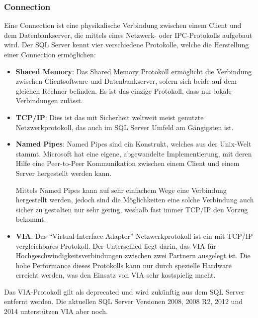         \subsubsection{Connection}
          Eine Connection ist eine physikalische Verbindung zwischen einem
          Client und dem Datenbankserver, die mittels eines Netzwerk- oder
          IPC-Protokolls aufgebaut wird. Der SQL Server kennt vier verschiedene
          Protokolle, welche die Herstellung einer Connection ermöglichen:
          \begin{itemize}
              \item \textbf{Shared Memory}: Das Shared Memory Protokoll
              ermöglicht die Verbindung zwischen Clientsoftware und
              Datenbankserver, sofern sich beide auf dem gleichen Rechner
              befinden. Es ist das einzige Protokoll, dass nur lokale
              Verbindungen zulässt.
              \item \textbf{TCP/IP}: Dies ist das mit Sicherheit weltweit meist
              genutzte Netzwerkprotokoll, das auch im SQL Server Umfeld am
              Gängigsten ist.
              \item \textbf{Named Pipes}: Named Pipes sind ein Konstrukt,
              welches aus der Unix-Welt stammt. Microsoft hat eine eigene,
              abgewandelte Implementierung, mit deren Hilfe eine Peer-to-Peer
              Kommunikation zwischen einem Client und einem Server hergestellt
              werden kann. 
              
              Mittels Named Pipes kann auf sehr einfachem Wege eine
              Verbindung hergestellt werden, jedoch sind die Möglichkeiten eine
              solche Verbindung auch sicher zu gestalten nur sehr gering,
              weshalb fast immer TCP/IP den Vorzug bekommt.
              \item \textbf{VIA}: Das \enquote{Virtual Interface Adapter}
              Netzwerkprotokoll ist ein mit TCP/IP vergleichbares Protokoll. Der
              Unterschied liegt darin, das VIA für
              Hochgeschwindigkeitsverbindungen zwischen zwei Partnern ausgelegt
              ist. Die hohe Performance dieses Protokolls kann nur durch
              spezielle Hardware erreicht werden, was den Einsatz von VIA sehr
              kostspielig macht.
          \end{itemize}
          \begin{merke}
            Das VIA-Protokoll gilt als deprecated und wird zukünftig aus dem SQL
            Server entfernt werden. Die aktuellen SQL Server Versionen 2008,
            2008 R2, 2012 und 2014 unterstützen VIA aber noch.
          \end{merke}
